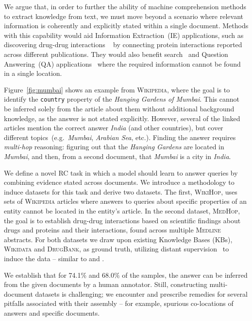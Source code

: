 \documentclass[11pt,letterpaper]{article}
\newcommand{\DrugBank}{\textsc{DrugBank}\xspace}
\newcommand{\MEDLINE}{\textsc{Medline}\xspace}
\newcommand{\MedHop}{\textsc{MedHop}\xspace}
\newcommand{\WikiHop}{\textsc{WikiHop}\xspace}
\newcommand{\Wikidata}{\textsc{Wikidata}\xspace}
\newcommand{\Wikipedia}{\textsc{Wikipedia}\xspace}
\begin{document}
We argue that, in order to further the ability of machine comprehension methods to extract knowledge from text,
we must move beyond a scenario where relevant information is coherently and explicitly stated within a single document.
Methods with this capability would aid Information Extraction~(IE) applications, such as discovering drug-drug interactions ~\cite{gurulingappa12development} by connecting protein interactions reported across different publications.
They would also benefit search~\cite{Carpineto_2012_survey} and Question Answering~(QA) applications~\cite{Lin_2001_DIRT} where the required information cannot be found in a single location.


Figure~\ref{fig:mumbai} shows an example from \Wikipedia, where the goal is to identify the {\small \texttt{country}} property of the \emph{Hanging Gardens of Mumbai}.
This cannot be inferred solely from the article about them without additional background knowledge, as the answer is not stated explicitly.
However, several of the linked articles mention the correct answer \emph{India} (and other countries), but cover different topics~(e.g.~\emph{Mumbai}, \emph{Arabian Sea}, etc.).
Finding the answer requires \emph{multi-hop} reasoning:
figuring out that the \emph{Hanging Gardens} are located in \emph{Mumbai}, and then, from a second document, that \emph{Mumbai} is a city in \emph{India}.


We define a novel RC task in which a model should learn to answer queries by combining evidence stated across documents.
We introduce a methodology to induce datasets for this task and derive two datasets.
The first, \WikiHop, uses sets of \Wikipedia articles where answers to queries about specific properties of an entity cannot be located in the entity's article.
In the second dataset, \MedHop, the goal is to establish drug-drug interactions based on scientific findings about drugs and proteins and their interactions, found across multiple \MEDLINE abstracts.
For both datasets we draw upon existing Knowledge Bases (KBs), \Wikidata and \DrugBank, as ground truth, utilizing distant supervision~\cite{mintz2009distant} to induce the data -- similar to  and .


We establish that for 74.1\% and 68.0\% of the samples, the answer can be inferred from the given documents by a human annotator.
Still, constructing multi-document datasets is challenging; we encounter and prescribe remedies for several pitfalls associated with their assembly -- for example, spurious co-locations of answers and specific documents.
\end{document}

